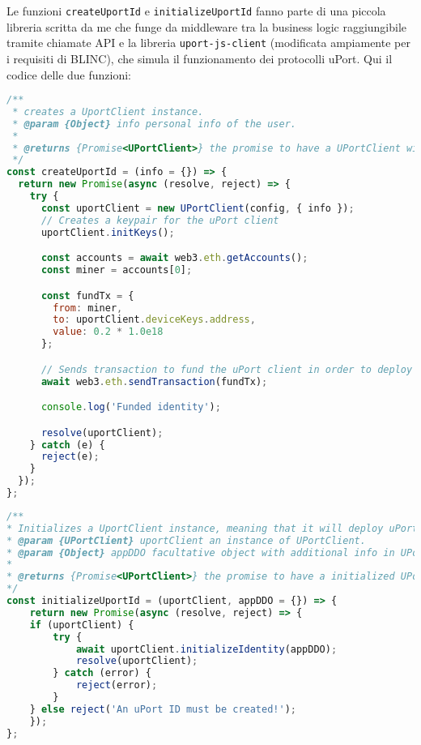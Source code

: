 Le funzioni \texttt{createUportId} e \texttt{initializeUportId} fanno parte di una piccola libreria scritta da me che funge da middleware tra
la business logic raggiungibile tramite chiamate API e la libreria \texttt{uport-js-client} (modificata ampiamente per i requisiti di BLINC),
che simula il funzionamento dei protocolli uPort. Qui il codice delle due funzioni:

\begin{lstlisting}[language=JavaScript]
/**
 * creates a UportClient instance.
 * @param {Object} info personal info of the user.
 *
 * @returns {Promise<UPortClient>} the promise to have a UPortClient with specified infos.
 */
const createUportId = (info = {}) => {
  return new Promise(async (resolve, reject) => {
    try {
      const uportClient = new UPortClient(config, { info });
      // Creates a keypair for the uPort client
      uportClient.initKeys();

      const accounts = await web3.eth.getAccounts();
      const miner = accounts[0];

      const fundTx = {
        from: miner,
        to: uportClient.deviceKeys.address,
        value: 0.2 * 1.0e18
      };

      // Sends transaction to fund the uPort client in order to deploy uPort contracts later
      await web3.eth.sendTransaction(fundTx);

      console.log('Funded identity');

      resolve(uportClient);
    } catch (e) {
      reject(e);
    }
  });
};
\end{lstlisting}

\begin{lstlisting}[language=JavaScript]
/**
* Initializes a UportClient instance, meaning that it will deploy uPort IdentityManager contract, save the DID Document on IPFS and save it on Registry contract.
* @param {UPortClient} uportClient an instance of UPortClient.
* @param {Object} appDDO facultative object with additional info in UPortClient is an instance of a uPort application
*
* @returns {Promise<UPortClient>} the promise to have a initialized UPortClient.
*/
const initializeUportId = (uportClient, appDDO = {}) => {
    return new Promise(async (resolve, reject) => {
    if (uportClient) {
        try {
            await uportClient.initializeIdentity(appDDO);
            resolve(uportClient);
        } catch (error) {
            reject(error);
        }
    } else reject('An uPort ID must be created!');
    });
};
\end{lstlisting}

